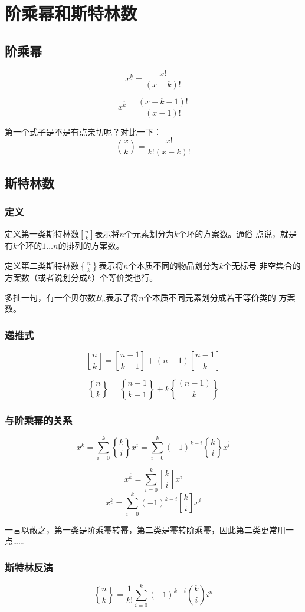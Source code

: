 \section{阶乘幂和斯特林数}
\subsection{阶乘幂}
\[x^{\underline k} = \frac{x!}{(x - k)!}\]\par
\[x^{\overline k} = \frac{(x + k - 1)!}{(x - 1)!}\]\par
第一个式子是不是有点亲切呢？对比一下：
\[\binom x k = \frac{x!}{k!(x - k)!}\]
\subsection{斯特林数}
\subsubsection{定义}
定义第一类斯特林数$n\brack k$表示将$n$个元素划分为$k$个环的方案数。通俗
点说，就是有$k$个环的$1\ldots n$的排列的方案数。\par
定义第二类斯特林数$n\brace k$表示将$n$个本质不同的物品划分为$k$个无标号
非空集合的方案数（或者说划分成$k$）个等价类也行。\par
多扯一句，有一个贝尔数$B_n$表示了将$n$个本质不同元素划分成若干等价类的
方案数。
\subsubsection{递推式}
\[{n\brack k} = {{n - 1}\brack {k - 1}} + (n - 1){{n - 1}\brack k}\]\par
\[{n\brace k} = {{n - 1}\brace {k - 1}} + k{(n - 1)\brace k}\]
\subsubsection{与阶乘幂的关系}
\[x^k = \sum_{i = 0}^k{k\brace i}x^{\underline i}
        = \sum_{i = 0}^k(-1)^{k - i}{k\brace i}x^{\overline i}\]\par
\[x^{\overline k} = \sum_{i = 0}^k{k\brack i}x^i\]
\[x^{\underline k} = \sum_{i = 0}^k(-1)^{k - i}{k\brack i}x^i\]\par
一言以蔽之，第一类是阶乘幂转幂，第二类是幂转阶乘幂，因此第二类更常用一点……
\subsubsection{斯特林反演}
\[{n\brace k} = \frac{1}{k!}\sum_{i = 0}^k(-1)^{k-i}\binom k ii^n\]
